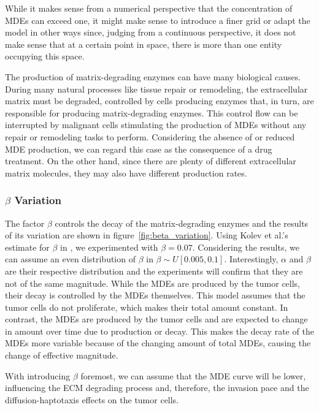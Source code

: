 While it makes sense from a numerical perspective that the concentration of MDEs can exceed one, it might make sense to introduce a finer grid or adapt the model in other ways since, judging from a continuous perspective, it does not make sense that at a certain point in space, there is more than one entity occupying this space.

The production of matrix-degrading enzymes can have many biological causes. During many natural processes like tissue repair or remodeling, the extracellular matrix must be degraded, controlled by cells producing enzymes that, in turn, are responsible for producing matrix-degrading enzymes. This control flow can be interrupted by malignant cells stimulating the production of MDEs without any repair or remodeling tasks to perform. Considering the absence of or reduced MDE production, we can regard this case as the consequence of a drug treatment. On the other hand, since there are plenty of different extracellular matrix molecules, they may also have different production rates.


\subsubsection*{$\beta$ Variation}
The factor $\beta$ controls the decay of the matrix-degrading enzymes and the results of its variation are shown in figure~\ref{fig:beta_variation}. Using Kolev et al.'s estimate for $\beta$ in \cite{Kolev2010}, we experimented with $\beta=0.07$. Considering the results, we can assume an even distribution of $\beta$ in $\beta \sim U[0.005, 0.1]$. Interestingly, $\alpha$ and $\beta$ are their respective distribution and the experiments will confirm that they are not of the same magnitude. While the MDEs are produced by the tumor cells, their decay is controlled by the MDEs themselves. This model assumes that the tumor cells do not proliferate, which makes their total amount constant. In contrast, the MDEs are produced by the tumor cells and are expected to change in amount over time due to production or decay. This makes the decay rate of the MDEs more variable because of the changing amount of total MDEs, causing the change of effective magnitude.

With introducing $\beta$ foremost, we can assume that the MDE curve will be lower, influencing the ECM degrading process and, therefore, the invasion pace and the diffusion-haptotaxis effects on the tumor cells. 

